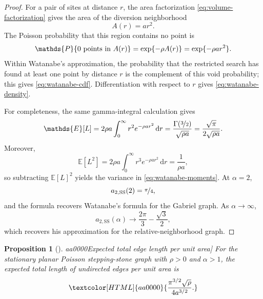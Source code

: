 \documentclass[a4paper,fleqn]{cas-dc}
\newtheorem{proposition}{Proposition}
\theoremstyle{definition}
\theoremstyle{remark}
\newcommand{\Pp}{\mathds{P}}
\newcommand{\E}{\mathds{E}}
\newcommand{\dd}{\,\mathrm{d}}
\newcommand{\0}{\mathbf{0}}
\newcommand{\tr}[1]{\textcolor[HTML]{aa0000}{#1}}
\begin{document}
\begin{proof}
For a pair of sites at distance $r$, the area factorization
\eqref{eq:volume-factorization} gives the area of the diversion neighborhood
\begin{equation}
    A(r)=a r^2.
\end{equation}
The Poisson probability that this region contains no point is
\begin{equation}
    \Pp\{0\text{ points in }A(r)\}\\
    =\exp\{-\rho A(r)\}
    =\exp\{-\rho a r^2\}.
\end{equation}
Within Watanabe's approximation, the probability that the restricted search
has found at least one point by distance $r$ is the complement of this void
probability; this gives \eqref{eq:watanabe-cdf}. Differentiation with respect to $r$ gives
\eqref{eq:watanabe-density}. 

For completeness, the same gamma-integral calculation gives
\begin{equation}
    \E[L]
    =2\rho a\int_0^\infty r^2e^{-\rho ar^2}\dd r
    =\frac{\Gamma(\nicefrac{3}{2})}{\sqrt{\rho a}}
    =\frac{\sqrt\pi}{2\sqrt{\rho a}}.
\end{equation}
Moreover,
\begin{equation}
    \E[L^2]
    =2\rho a\int_0^\infty r^3e^{-\rho ar^2}\dd r
    =\frac{1}{\rho a},
\end{equation}
so subtracting $\E[L]^2$ yields the variance in
\eqref{eq:watanabe-moments}. At $\alpha=2$,
\begin{equation}
a_{2,\mathrm{SS}}(2)=\nicefrac{\pi}{4},
\end{equation} 
and the formula recovers Watanabe's formula for
the Gabriel graph. As $\alpha\to\infty$,
\begin{equation}
    a_{2,\mathrm{SS}}(\alpha)
    \longrightarrow \frac{2\pi}{3}-\frac{\sqrt3}{2},
\end{equation}
which recovers his approximation for the relative-neighborhood graph.
\end{proof}

\begin{proposition}[\tr{Expected total edge length per unit area}]
\label{prop:poisson-total-edge-length}
\tr{For the stationary planar Poisson stepping-stone graph with
$\rho>0$ and $\alpha>1$, the expected total length of undirected
edges per unit area is}
\begin{equation}\label{eq:poisson-total-length-per-area}
\tr{\frac{\pi^{3/2}\sqrt{\rho}}{4a^{3/2}}.}
\end{equation}
\end{proposition}
\end{document}
